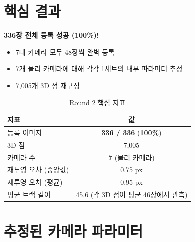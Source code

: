 \documentclass[11pt, a4paper]{report}
\begin{document}
\section{핵심 결과}

\begin{successbox}
\textbf{336장 전체 등록 성공 (100\%)!}
\begin{itemize}[nosep]
  \item 7대 카메라 모두 48장씩 완벽 등록
  \item 7개 물리 카메라에 대해 각각 1세트의 내부 파라미터 추정
  \item 7,005개 3D 점 재구성
\end{itemize}
\end{successbox}

\begin{table}[H]
\centering
\caption{Round 2 핵심 지표}
\renewcommand{\arraystretch}{1.3}
\begin{tabular}{lc}
\toprule
\textbf{지표} & \textbf{값} \\
\midrule
등록 이미지 & \textbf{336 / 336} (\textcolor{thmgreen}{\textbf{100\%}}) \\
3D 점 & 7,005 \\
카메라 수 & \textbf{7} (물리 카메라) \\
재투영 오차 (중앙값) & 0.75 px \\
재투영 오차 (평균) & 0.95 px \\
평균 트랙 길이 & 45.6 (각 3D 점이 평균 46장에서 관측) \\
\bottomrule
\end{tabular}
\end{table}


\section{추정된 카메라 파라미터}
\end{document}

